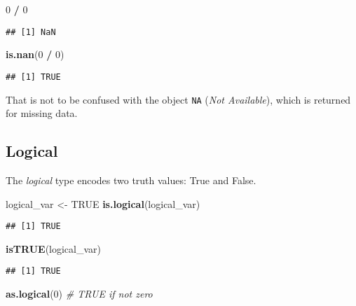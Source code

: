 \documentclass[
]{book}
\newenvironment{Shaded}{\begin{snugshade}}{\end{snugshade}}
\newcommand{\CommentTok}[1]{\textcolor[rgb]{0.56,0.35,0.01}{\textit{#1}}}
\newcommand{\DecValTok}[1]{\textcolor[rgb]{0.00,0.00,0.81}{#1}}
\newcommand{\KeywordTok}[1]{\textcolor[rgb]{0.13,0.29,0.53}{\textbf{#1}}}
\newcommand{\NormalTok}[1]{#1}
\newcommand{\OperatorTok}[1]{\textcolor[rgb]{0.81,0.36,0.00}{\textbf{#1}}}
\newcommand{\OtherTok}[1]{\textcolor[rgb]{0.56,0.35,0.01}{#1}}
\newcommand{\StringTok}[1]{\textcolor[rgb]{0.31,0.60,0.02}{#1}}
\begin{document}
\begin{Shaded}
\begin{Highlighting}[]
\DecValTok{0} \OperatorTok{/}\StringTok{ }\DecValTok{0}
\end{Highlighting}
\end{Shaded}

\begin{verbatim}
## [1] NaN
\end{verbatim}

\begin{Shaded}
\begin{Highlighting}[]
\KeywordTok{is.nan}\NormalTok{(}\DecValTok{0} \OperatorTok{/}\StringTok{ }\DecValTok{0}\NormalTok{)}
\end{Highlighting}
\end{Shaded}

\begin{verbatim}
## [1] TRUE
\end{verbatim}

That is not to be confused with the object \texttt{NA} (\emph{Not Available}), which is returned for missing data.

\hypertarget{logical}{%
\subsection{Logical}\label{logical}}

The \emph{logical} type encodes two truth values: True and False.

\begin{Shaded}
\begin{Highlighting}[]
\NormalTok{logical_var <-}\StringTok{ }\OtherTok{TRUE}
\KeywordTok{is.logical}\NormalTok{(logical_var)}
\end{Highlighting}
\end{Shaded}

\begin{verbatim}
## [1] TRUE
\end{verbatim}

\begin{Shaded}
\begin{Highlighting}[]
\KeywordTok{isTRUE}\NormalTok{(logical_var)}
\end{Highlighting}
\end{Shaded}

\begin{verbatim}
## [1] TRUE
\end{verbatim}

\begin{Shaded}
\begin{Highlighting}[]
\KeywordTok{as.logical}\NormalTok{(}\DecValTok{0}\NormalTok{) }\CommentTok{# TRUE if not zero}
\end{Highlighting}
\end{Shaded}
\end{document}
